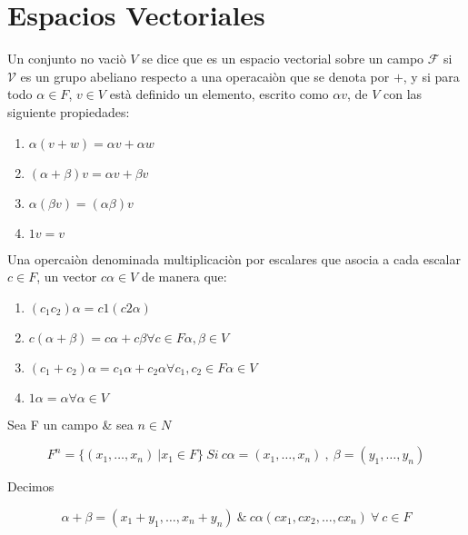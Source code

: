 \newpage 
\section{Espacios Vectoriales}

	\begin{definicion}

Un conjunto no vaci\`o $V$  se dice que es un espacio vectorial sobre un campo $\mathcal{F}$ si $\mathcal{V}$ es un grupo abeliano respecto a una operacai\`on que se denota por $+$, y si para todo $\alpha \in F$, $v\in V$ est\`a definido un elemento, escrito como $\alpha v$, de $V$ con las siguiente propiedades: 
\end{definicion}
 \begin{enumerate}
  \item $\alpha (v+w)=\alpha v+\alpha w$
  \item $(\alpha+\beta )v=\alpha v+\beta v$
  \item $\alpha(\beta v)=(\alpha\beta)v$
  \item $1v=v$
\end{enumerate}

Una opercai\`on denominada multiplicaci\`on por escalares que asocia a cada escalar $c\in F  $, un vector $c \alpha \in V$ de manera que:

\begin{enumerate}[a]
	\item $( c_1 c_2 ) \alpha = c1 ( c2 \alpha )$
	\item $c ( \alpha + \beta ) = c \alpha + c \beta \forall c \in F \alpha,\beta \in V$
	\item $(c_1 + c_2 ) \alpha = c_1  \alpha + c_2 \alpha \forall c_1 , c_2 \in F \alpha \in V$
	\item $ 1 \alpha = \alpha \forall \alpha \in V$	
\end{enumerate}
		
		\begin{definicion}
		Sea F un campo \& sea $n \in N$
		\end{definicion}		
		
		\begin{equation}
		F^n = \{ ( x_1 , \dots  , x_n) \ | x_1 \in F \} \ 
		Si  \ c \alpha = ( x_1 , \dots , x_n ) \ , \ \beta = ( y_1 , \dots , y_n )		
		\end{equation}
		
		Decimos 
		
		\begin{equation}
		\alpha + \beta = ( x_1 + y_1 , \dots , x_n + y_n  ) \ \&  \ c\alpha ( c x_1 ,c x_2 , 		\dots , c x_n ) \ \forall \ c \in F \nonumber
		\end{equation}				
		
